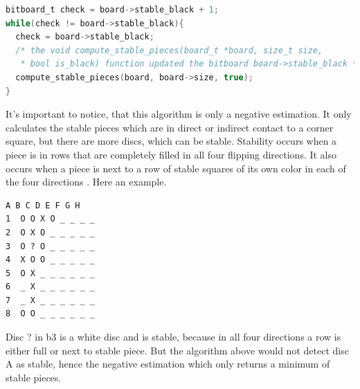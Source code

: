 \begin{lstlisting}[language=c]
bitboard_t check = board->stable_black + 1;
while(check != board->stable_black){
  check = board->stable_black;
  /* the void compute_stable_pieces(board_t *board, size_t size, 
   * bool is_black) function updated the bitboard board->stable_black */
  compute_stable_pieces(board, board->size, true);
}
\end{lstlisting}
It's important to notice, that this algorithm is only a negative estimation. It only calculates the stable pieces which are in direct or indirect contact to a corner square, but there are more discs, which can be stable. Stability occurs when a piece is in rows that are completely filled in all four flipping directions. It also occurs when a piece is next to a row of stable squares of its own color in each of the four directions \cite{ OthelloImplementation}. Here an example.
\begin{Verbatim}[frame=single]
   A B C D E F G H
1  O O X O _ _ _ _
2  O X O _ _ _ _ _
3  O ? O _ _ _ _ _
4  X O O _ _ _ _ _
5  O X _ _ _ _ _ _
6  _ X _ _ _ _ _ _
7  _ X _ _ _ _ _ _
8  O O _ _ _ _ _ _
\end{Verbatim}
Disc ? in b3 is a white disc and is stable, because in all four directions a row is either full or next to stable piece. But the algorithm above would not detect disc A as stable, hence the negative estimation which only returns a minimum of stable pieces.\newpage
